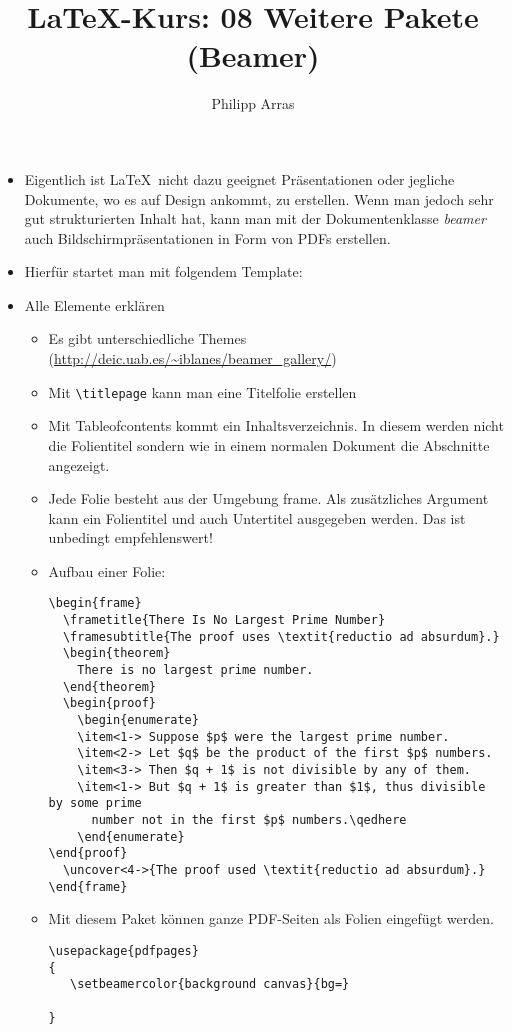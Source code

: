 \documentclass[11pt,a4paper]{scrartcl}
\author{Philipp Arras}
\title{\LaTeX -Kurs: 08 Weitere Pakete (Beamer)}
\begin{document}
\maketitle

\begin{itemize}
\item Eigentlich ist \LaTeX\ nicht dazu geeignet Präsentationen oder jegliche Dokumente, wo es auf Design ankommt, zu erstellen. Wenn man jedoch sehr gut strukturierten Inhalt hat, kann man mit der Dokumentenklasse \emph{beamer} auch Bildschirmpräsentationen in Form von PDFs erstellen.
\item Hierfür startet man mit folgendem Template: 
\item Alle Elemente erklären
  \begin{itemize}
    \item Es gibt unterschiedliche Themes (\url{http://deic.uab.es/~iblanes/beamer_gallery/})
    \item Mit \verb|\titlepage| kann man eine Titelfolie erstellen
    \item Mit Tableofcontents kommt ein Inhaltsverzeichnis. In diesem werden nicht die Folientitel sondern wie in einem normalen Dokument die Abschnitte angezeigt.
    \item Jede Folie besteht aus der Umgebung frame. Als zusätzliches Argument kann ein Folientitel und auch Untertitel ausgegeben werden. Das ist unbedingt empfehlenswert!
    \item Aufbau einer Folie:
    \begin{lstlisting}
\begin{frame}
  \frametitle{There Is No Largest Prime Number}
  \framesubtitle{The proof uses \textit{reductio ad absurdum}.}
  \begin{theorem}
    There is no largest prime number.
  \end{theorem}
  \begin{proof}
    \begin{enumerate}
    \item<1-> Suppose $p$ were the largest prime number.
    \item<2-> Let $q$ be the product of the first $p$ numbers.
    \item<3-> Then $q + 1$ is not divisible by any of them.
    \item<1-> But $q + 1$ is greater than $1$, thus divisible by some prime
      number not in the first $p$ numbers.\qedhere
    \end{enumerate}
\end{proof}
  \uncover<4->{The proof used \textit{reductio ad absurdum}.}
\end{frame}
    \end{lstlisting}
    \item Mit diesem Paket können ganze PDF-Seiten als Folien eingefügt werden.
    \begin{lstlisting}
\usepackage{pdfpages}
{
   \setbeamercolor{background canvas}{bg=}
   
}
    \end{lstlisting}
    

  \end{itemize}	
\end{itemize}
\end{document}
